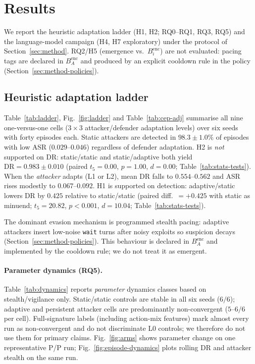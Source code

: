 \section{Results}
\label{sec:results}

We report the heuristic adaptation ladder (H1, H2; RQ0--RQ1, RQ3, RQ5) and
the language-model campaign (H4, H7 exploratory) under the protocol of
Section~\ref{sec:method}. RQ2/H5 (emergence vs.\ $B_i^{\mathrm{enc}}$) are not
evaluated: pacing tags are declared in $B_A^{\mathrm{enc}}$ and produced by an
explicit cooldown rule in the policy (Section~\ref{sec:method-policies}).

\subsection{Heuristic adaptation ladder}
\label{sec:results-ladder}
Table~\ref{tab:ladder}, Fig.~\ref{fig:ladder} and Table~\ref{tab:cep-adj}
summarise all nine one-versus-one cells ($3{\times}3$ attacker/defender
adaptation levels) over six seeds with forty episodes each. Static attackers are
detected in $98.3{\pm}1.0\%$ of episodes with low ASR ($0.029$--$0.046$)
regardless of defender adaptation. H2 is \emph{not} supported on DR: static/static
and static/adaptive both yield $\mathrm{DR}=0.983{\pm}0.010$ (paired
$t_{5}=0.00$, $p=1.00$, $d=0.00$; Table~\ref{tab:stats-tests}). When the
\emph{attacker} adapts (L1 or L2), mean DR falls to $0.554$--$0.562$ and ASR
rises modestly to $0.067$--$0.092$. H1 is supported on detection: adaptive/static lowers DR by
$0.425$ relative to static/static (paired diff.\ $=+0.425$ with static as minuend;
$t_{5}=20.82$, $p<0.001$, $d=10.04$; Table~\ref{tab:stats-tests}).

The dominant evasion mechanism is programmed stealth pacing: adaptive attackers
insert low-noise \texttt{wait} turns after noisy exploits so suspicion decays
(Section~\ref{sec:method-policies}). This behaviour is declared in
$B_A^{\mathrm{enc}}$ and implemented by the cooldown rule; we do not treat it
as emergent.



\paragraph{Parameter dynamics (RQ5).}
Table~\ref{tab:dynamics} reports \emph{parameter} dynamics classes based on
stealth/vigilance only. Static/static controls are stable in all six seeds
($6/6$); adaptive and persistent attacker cells are predominantly
non-convergent ($5$--$6/6$ per cell). Full-signature labels (including action-mix
features) mark almost every run as non-convergent and do not discriminate L0
controls; we therefore do not use them for primary claims. Fig.~\ref{fig:arms}
shows parameter change on one representative P/P run; Fig.~\ref{fig:episode-dynamics}
plots rolling DR and attacker stealth on the same run.

